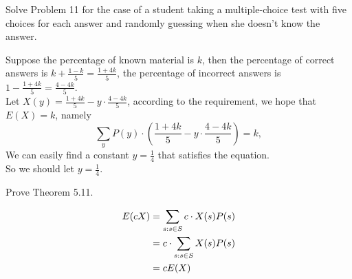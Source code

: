 \documentclass[12pt, a4paper, UTF8]{ctexart}
\begin{document}
\begin{problem}[CS: 5.4.12]
  Solve Problem 11 for the case of a student taking a multiple-choice test 
  with five choices for each answer and randomly guessing when she doesn't 
  know the answer.
\end{problem}

\begin{solution}
  Suppose the percentage of known material is $k$, then the percentage of correct 
  answers is $k + \frac{1-k}{5} = \frac{1+4k}{5}$, the percentage of incorrect 
  answers is $1 - \frac{1+4k}{5} = \frac{4-4k}{5}$.\\
  Let $X(y) = \frac{1+4k}{5} - y\cdot \frac{4-4k}{5}$, according to the requirement, 
  we hope that $E(X) = k$, namely
  \[\sum_{y} P(y) \cdot (\frac{1+4k}{5} - y\cdot \frac{4-4k}{5}) = k,\]
  We can easily find a constant $y = \frac{1}{4}$ that satisfies the equation.\\
  So we should let $y = \frac{1}{4}$.
\end{solution}

\begin{problem}[CS: 5.4.15]
  Prove Theorem 5.11.
\end{problem}

\begin{solution}
  \begin{align}
    E(cX) & = \sum_{s:s\in S} c\cdot X(s) P(s) \notag \\
          & = c\cdot \sum_{s:s\in S} X(s)P(s) \notag \\
          & = cE(X) \notag
  \end{align}
\end{solution}
\end{document}
